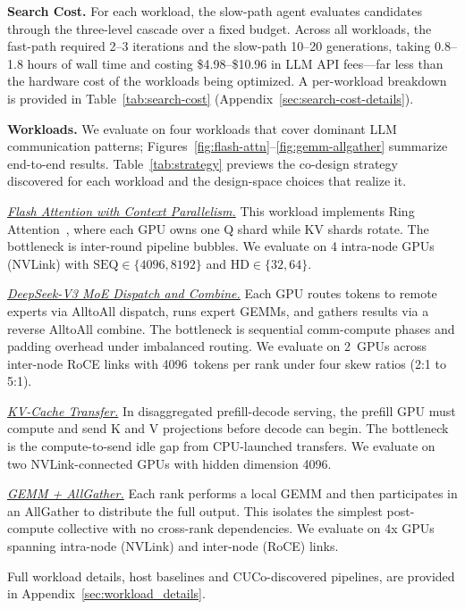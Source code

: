 \noindent\textbf{Search Cost.} For each workload, the slow-path agent evaluates candidates through the three-level cascade over a fixed budget. Across all workloads, the fast-path required 2--3 iterations and the slow-path 10--20 generations, taking 0.8--1.8 hours of wall time and costing \$4.98--\$10.96 in LLM API fees---far less than the hardware cost of the workloads being optimized. A per-workload breakdown is provided in Table~\ref{tab:search-cost} (Appendix~\ref{sec:search-cost-details}).

\noindent\textbf{Workloads.} We evaluate on four workloads that cover dominant LLM communication patterns; Figures~\ref{fig:flash-attn}--\ref{fig:gemm-allgather} summarize end-to-end results. Table~\ref{tab:strategy} previews the co-design strategy \cufuse{} discovered for each workload and the design-space choices that realize it.

\noindent\underline{\emph{Flash Attention with Context Parallelism.}}
This workload implements Ring Attention~\cite{liu2024ringattention}, where each GPU owns one Q shard while KV shards rotate. The bottleneck is inter-round pipeline bubbles. We evaluate on 4 intra-node GPUs (NVLink) with $\text{SEQ} \in \{4096, 8192\}$ and $\text{HD} \in \{32, 64\}$.

\noindent\underline{\emph{DeepSeek-V3 MoE Dispatch and Combine.}}
Each GPU routes tokens to remote experts via AlltoAll dispatch, runs expert GEMMs, and gathers results via a reverse AlltoAll combine. The bottleneck is sequential comm-compute phases and padding overhead under imbalanced routing. We evaluate on 2~GPUs across inter-node RoCE links with 4096~tokens per rank under four skew ratios (2:1 to 5:1).

\noindent\underline{\emph{KV-Cache Transfer.}}
In disaggregated prefill-decode serving, the prefill GPU must compute and send K and V projections before decode can begin. The bottleneck is the compute-to-send idle gap from CPU-launched transfers. We evaluate on two NVLink-connected GPUs with hidden dimension 4096.

\noindent\underline{\emph{GEMM + AllGather.}}
Each rank performs a local GEMM and then participates in an AllGather to distribute the full output. This isolates the simplest post-compute collective with no cross-rank dependencies. We evaluate on 4x GPUs spanning intra-node (NVLink) and inter-node (RoCE) links.

\noindent Full workload details, host baselines and CUCo-discovered pipelines, are provided in Appendix~\ref{sec:workload_details}.

